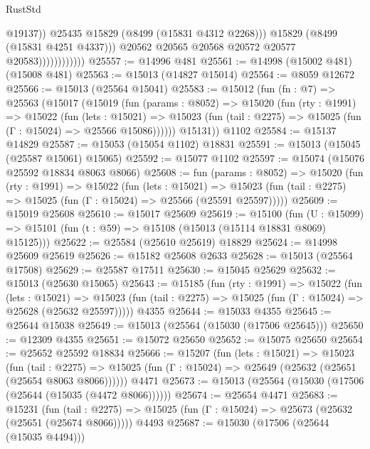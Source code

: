 \begin{lexlean}{RustStd}
\begin{coremodule}
                                    @19137))
                                @25435
                                @15829
                                (@8499 (@15831 @4312 @2268)))
                              @15829
                              (@8499 (@15831 @4251 @4337)))
                            @20562
                            @20565
                            @20568
                            @20572
                            @20577
                            @20583))))))))))))
@25557 := @14996 @481
@25561 := @14998 (@15002 @481) (@15008 @481)
@25563 := @15013 (@14827 @15014)
@25564 := @8059 @12672
@25566 := @15013 (@25564 @15041)
@25583 := @15012
    (fun (fn : @7) =>
    @25563
      (@15017
        (@15019
          (fun (params : @8052) =>
          @15020
            (fun (rty : @1991) =>
            @15022
              (fun (lets : @15021) =>
              @15023 (fun (tail : @2275) => @15025 (fun (Γ : @15024) => @25566 @15086))))))
        @15131))
    @1102
@25584 := @15137 @14829
@25587 := @15053 (@15054 @1102) @18831
@25591 := @15013 (@15045 (@25587 @15061) @15065)
@25592 := @15077 @1102
@25597 := @15074 (@15076 @25592 @18834 @8063 @8066)
@25608 := fun (params : @8052) =>
  @15020
    (fun (rty : @1991) =>
    @15022
      (fun (lets : @15021) =>
      @15023 (fun (tail : @2275) => @15025 (fun (Γ : @15024) => @25566 (@25591 @25597)))))
@25609 := @15019 @25608
@25610 := @15017 @25609
@25619 := @15100
    (fun (U : @15099) => @15101 (fun (t : @59) => @15108 (@15013 (@15114 @18831 @8069) @15125)))
@25622 := @25584 (@25610 @25619) @18829
@25624 := @14998 @25609 @25619
@25626 := @15182 @25608 @2633
@25628 := @15013 (@25564 @17508)
@25629 := @25587 @17511
@25630 := @15045 @25629
@25632 := @15013 (@25630 @15065)
@25643 := @15185
    (fun (rty : @1991) =>
    @15022
      (fun (lets : @15021) =>
      @15023 (fun (tail : @2275) => @15025 (fun (Γ : @15024) => @25628 (@25632 @25597)))))
    @4355
@25644 := @15033 @4355
@25645 := @25644 @15038
@25649 := @15013 (@25564 (@15030 (@17506 @25645)))
@25650 := @12309 @4355
@25651 := @15072 @25650
@25652 := @15075 @25650
@25654 := @25652 @25592 @18834
@25666 := @15207
    (fun (lets : @15021) =>
    @15023
      (fun (tail : @2275) =>
      @15025 (fun (Γ : @15024) => @25649 (@25632 (@25651 (@25654 @8063 @8066))))))
    @4471
@25673 := @15013 (@25564 (@15030 (@17506 (@25644 (@15035 (@4472 @8066))))))
@25674 := @25654 @4471
@25683 := @15231
    (fun (tail : @2275) => @15025 (fun (Γ : @15024) => @25673 (@25632 (@25651 (@25674 @8066)))))
    @4493
@25687 := @15030 (@17506 (@25644 (@15035 @4494)))

\end{coremodule}
\end{lexlean}
